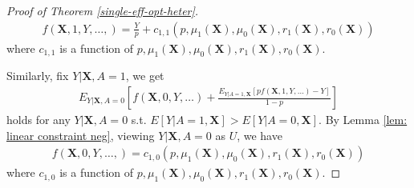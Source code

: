 \documentclass[11pt]{article}
\theoremstyle{referenceplain}
\theoremstyle{referencedefinition}
\theoremstyle{referenceremark}
\begin{document}
\begin{proof}[Proof of Theorem \ref{single-eff-opt-heter}]
\begin{align*}
    f(\mathbf{X},1,Y,\dots,) = \frac{Y}{p} + c_{1,1}(p,\mu_1(\mathbf{X}),\mu_0(\mathbf{X}),r_1(\mathbf{X}),r_0(\mathbf{X}))
\end{align*}
where $c_{1,1}$ is a function of $p,\mu_1(\mathbf{X}),\mu_0(\mathbf{X}),r_1(\mathbf{X}),r_0(\mathbf{X})$.

Similarly, fix $Y|\mathbf{X},A=1$, we get
\begin{align}
    E_{Y|\mathbf{X},A=0}\left[f(\mathbf{X},0,Y,\dots) + \frac{E_{Y|A=1,\mathbf{X}}[ p f(\mathbf{X},1,Y,\dots)-Y]}{1-p}\right]
\end{align}
holds for any $Y|\mathbf{X},A=0$ s.t.  $E[Y|A=1,\mathbf{X}] > E[Y|A=0,\mathbf{X}]$. By Lemma \ref{lem: linear constraint neg}, viewing $Y|\mathbf{X},A=0$ as $U$, we have
    \begin{align*}
        f(\mathbf{X},0,Y,\dots,) =  c_{1,0}(p,\mu_1(\mathbf{X}),\mu_0(\mathbf{X}),r_1(\mathbf{X}),r_0(\mathbf{X}))
    \end{align*}
where $c_{1,0}$ is a function of $p,\mu_1(\mathbf{X}),\mu_0(\mathbf{X}),r_1(\mathbf{X}),r_0(\mathbf{X})$.


\end{proof}
\end{document}
